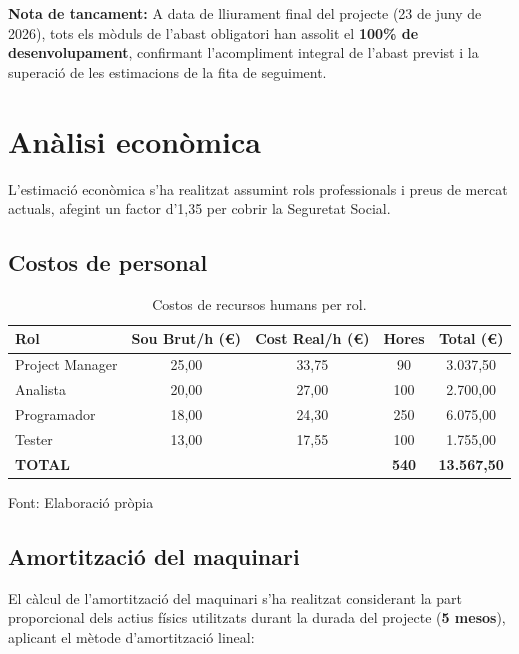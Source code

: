 \textbf{Nota de tancament:} A data de lliurament final del projecte (23 de juny de 2026), tots els mòduls de l'abast obligatori han assolit el \textbf{100\% de desenvolupament}, confirmant l'acompliment integral de l'abast previst i la superació de les estimacions de la fita de seguiment.

\section{Anàlisi econòmica}
L'estimació econòmica s'ha realitzat assumint rols professionals i preus de mercat actuals, afegint un factor d'1,35 per cobrir la Seguretat Social.

\clearpage
\subsection{Costos de personal}
\begin{table}[htbp]
  \centering
  \caption{Costos de recursos humans per rol.}
  \label{tab:costos_humans}
  \begin{tabular}{@{}lcccc@{}}
    \toprule
    \textbf{Rol}       & \textbf{Sou Brut/h (\euro{})} & \textbf{Cost Real/h (\euro{})} & \textbf{Hores} & \textbf{Total (\euro{})} \\ \midrule
    Project Manager    & 25,00                   & 33,75                    & 90             & 3.037,50           \\
    Analista           & 20,00                   & 27,00                    & 100            & 2.700,00           \\
    Programador        & 18,00                   & 24,30                    & 250            & 6.075,00           \\
    Tester             & 13,00                   & 17,55                    & 100            & 1.755,00           \\ \midrule
    \textbf{TOTAL}     &                         &                          & \textbf{540}   & \textbf{13.567,50} \\ \bottomrule
  \end{tabular}
  \par\smallskip
  \small Font: Elaboració pròpia
\end{table}

\subsection{Amortització del maquinari}
\label{sec:amortitzacio}
El càlcul de l'amortització del maquinari s'ha realitzat considerant la part proporcional dels actius físics utilitzats durant la durada del projecte (\textbf{5 mesos}), aplicant el mètode d'amortització lineal:

